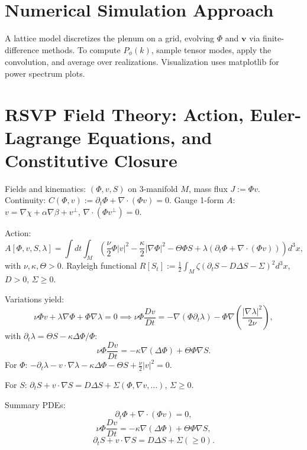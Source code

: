 \documentclass[12pt, a4paper, openany]{book}
\theoremstyle{definition}
\begin{document}
\chapter{Numerical Simulation Approach}
A lattice model discretizes the plenum on a grid, evolving $\Phi$ and $\mathbf{v}$ via finite-difference methods. To compute $P_\phi(k)$, sample tensor modes, apply the convolution, and average over realizations. Visualization uses matplotlib for power spectrum plots.

\chapter{RSVP Field Theory: Action, Euler-Lagrange Equations, and Constitutive Closure}
Fields and kinematics: $(\Phi, v, S)$ on 3-manifold $M$, mass flux $J := \Phi v$. Continuity: $C(\Phi, v) := \partial_t \Phi + \nabla \cdot (\Phi v) = 0$. Gauge 1-form $A$: $v = \nabla \chi + \alpha \nabla \beta + v^\perp$, $\nabla \cdot (\Phi v^\perp) = 0$.

Action:
\begin{equation}
A[\Phi, v, S, \lambda] = \int dt \int_M \left( \frac{\nu}{2} \Phi |v|^2 - \frac{\kappa}{2} |\nabla \Phi|^2 - \Theta \Phi S + \lambda (\partial_t \Phi + \nabla \cdot (\Phi v)) \right) d^3x,
\end{equation}
with $\nu, \kappa, \Theta > 0$. Rayleigh functional $R[S_t] := \frac{1}{2} \int_M \zeta (\partial_t S - D \Delta S - \Sigma)^2 d^3x$, $D > 0$, $\Sigma \ge 0$.

Variations yield:
\begin{equation}
\nu \Phi v + \lambda \nabla \Phi + \Phi \nabla \lambda = 0 \implies \nu \Phi \frac{Dv}{Dt} = - \nabla (\Phi \partial_t \lambda) - \Phi \nabla \left( \frac{|\nabla \lambda|^2}{2\nu} \right),
\end{equation}
with $\partial_t \lambda = \Theta S - \kappa \Delta \Phi / \Phi$:
\begin{equation}
\nu \Phi \frac{Dv}{Dt} = - \kappa \nabla (\Delta \Phi) + \Theta \Phi \nabla S.
\end{equation}
For $\Phi$: $-\partial_t \lambda - v \cdot \nabla \lambda - \kappa \Delta \Phi - \Theta S + \frac{\nu}{2} |v|^2 = 0$.

For $S$: $\partial_t S + v \cdot \nabla S = D \Delta S + \Sigma (\Phi, \nabla v, \dots )$, $\Sigma \ge 0$.

Summary PDEs:
\begin{equation}
\partial_t \Phi + \nabla \cdot (\Phi v) = 0,
\end{equation}
\begin{equation}
\nu \Phi \frac{Dv}{Dt} = - \kappa \nabla (\Delta \Phi) + \Theta \Phi \nabla S,
\end{equation}
\begin{equation}
\partial_t S + v \cdot \nabla S = D \Delta S + \Sigma (\ge 0).
\end{equation}


\end{document}
